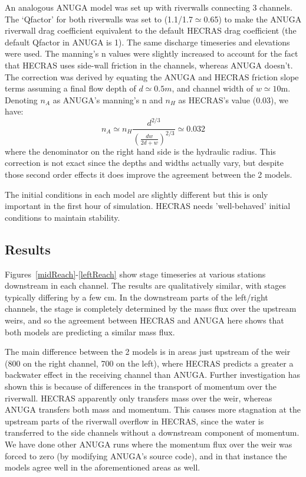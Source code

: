 An analogous ANUGA model was set up with riverwalls connecting 3 channels. The
`Qfactor' for both riverwalls was set to (1.1/1.7$\simeq$0.65) to make the
ANUGA riverwall drag coefficient equivalent to the default HECRAS drag
coefficient (the default Qfactor in ANUGA is 1). The same discharge timeseries
and elevations were used. The manning's n values were slightly increased to
account for the fact that HECRAS uses side-wall friction in the channels,
whereas ANUGA doesn't. The correction was derived by equating the ANUGA and
HECRAS friction slope terms assuming a final flow depth of $d \simeq 0.5m$, and
channel width of $ w \simeq 10$m. Denoting $n_{A}$ as ANUGA's manning's n and
$n_{H}$ as HECRAS's value (0.03), we have:
\begin{equation}
n_{A} \simeq n_{H}\frac{d^{2/3}}{( \frac{dw}{2d + w} )^{2/3}} \simeq 0.032
\end{equation}
where the denominator on the right hand side is the hydraulic radius. This
correction is not exact since the depths and widths actually vary, but despite
those second order effects it does improve the agreement between the 2 models.

The initial conditions in each model are slightly different but this is only
important in the first hour of simulation. HECRAS needs 'well-behaved' initial
conditions to maintain stability. 

\subsection{Results}

Figures~\ref{midReach}-\ref{leftReach} show stage timeseries at various
stations downstream in each channel. The results are qualitatively similar,
with stages typically differing by a few cm. In the downstream parts of the
left/right channels, the stage is completely determined by the mass flux over
the upstream weirs, and so the agreement between HECRAS and ANUGA here shows
that both models are predicting a similar mass flux.

The main difference between the 2 models is in areas just upstream of the weir
(800 on the right channel, 700 on the left), where HECRAS predicts a greater a
backwater effect in the receiving channel than ANUGA. Further investigation has
shown this is because of differences in the transport of momentum over the
riverwall. HECRAS apparently only transfers mass over the weir, whereas ANUGA
transfers both mass and momentum. This causes more stagnation at the upstream
parts of the riverwall overflow in HECRAS, since the water is transferred to
the side channels without a downstream component of momentum. We have done
other ANUGA runs where the momentum flux over the weir was forced to zero (by
modifying ANUGA's source code), and in that instance the models agree well in
the aforementioned areas as well.

